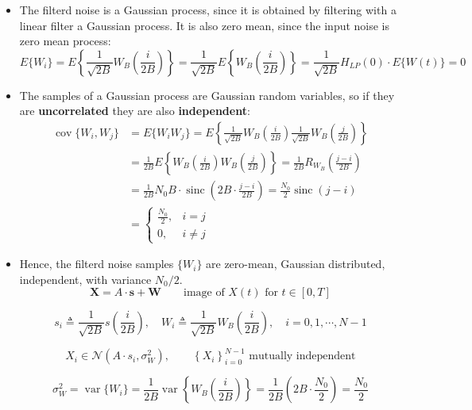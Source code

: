 \begin{itemize}
    \item The filterd noise is a Gaussian process, since it is obtained by filtering with a linear filter a Gaussian process. It is also zero mean, since the input noise is zero mean process:
    \[
    E\{W_i\} = E\left\{ \frac{1}{\sqrt{2B}} W_B \left( \frac{i}{2B} \right) \right\}
    = \frac{1}{\sqrt{2B}} E\left\{ W_B \left( \frac{i}{2B} \right) \right\}
    = \frac{1}{\sqrt{2B}} H_{LP}(0) \cdot E\{ W(t) \} = 0
    \]
    \item The samples of a Gaussian process are Gaussian random variables, so if they are \textbf{uncorrelated} they are also \textbf{independent}:
    \[
\begin{aligned}
\operatorname{cov}\{W_i, W_j\} &= E\{W_i W_j\} = E\left\{ \frac{1}{\sqrt{2B}} W_B\left(\frac{i}{2B}\right) \frac{1}{\sqrt{2B}} W_B\left(\frac{j}{2B}\right) \right\} \\
&= \frac{1}{2B} E\left\{ W_B\left(\frac{i}{2B}\right) W_B\left(\frac{j}{2B}\right) \right\}
= \frac{1}{2B} R_{W_B}\left( \frac{j-i}{2B} \right) \\
&= \frac{1}{2B} N_0 B \cdot \operatorname{sinc}\left( 2B \cdot \frac{j-i}{2B} \right)
= \frac{N_0}{2} \operatorname{sinc}(j - i) \\
&= 
\begin{cases}
\frac{N_0}{2}, & i = j \\
0, & i \neq j
\end{cases}
\end{aligned}
    \]
    \item Hence, the filterd noise samples \(\{W_i\}\) are zero-mean, Gaussian distributed, independent, with variance \(N_0/2\).
    \[
    \mathbf{X} = A \cdot \mathbf{s} + \mathbf{W} 
    \qquad \text{image of } X(t) \text{ for } t \in [0,T]
    \]

    \[
    s_i \triangleq \frac{1}{\sqrt{2B}} s\left( \frac{i}{2B} \right), \quad
    W_i \triangleq \frac{1}{\sqrt{2B}} W_B\left( \frac{i}{2B} \right), \quad i = 0,1,\cdots, N-1
    \]
    
    \[
    X_i \in \mathcal{N}(A \cdot s_i, \sigma^2_W), \qquad \left\{ X_i \right\}_{i=0}^{N-1} \text{ mutually independent}
    \]

    \[
    \sigma^2_W = \operatorname{var}\{W_i\} = \frac{1}{2B} \operatorname{var}\left\{ W_B\left( \frac{i}{2B} \right) \right\} = \frac{1}{2B} \left( 2B \cdot \frac{N_0}{2} \right) = \frac{N_0}{2}
    \]


\end{itemize}
